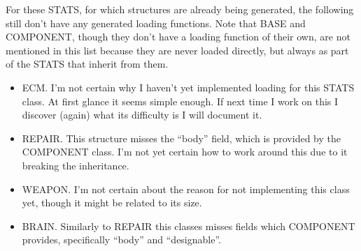 \documentclass{article}
\begin{document}
For these STATS, for which structures are already being generated, the following
still don't have any generated loading functions. Note that BASE and COMPONENT,
though they don't have a loading function of their own, are not mentioned in
this list because they are never loaded directly, but always as part of the
STATS that inherit from them.
\begin{itemize}
  \item ECM. I'm not certain why I haven't yet implemented loading for this
    STATS class. At first glance it seems simple enough. If next time I work on
    this I discover (again) what its difficulty is I will document it.
  \item REPAIR. This structure misses the ``body'' field, which is provided by
    the COMPONENT class. I'm not yet certain how to work around this due to it
    breaking the inheritance.
  \item WEAPON. I'm not certain about the reason for not implementing this class
    yet, though it might be related to its size.
  \item BRAIN. Similarly to REPAIR this classes misses fields which COMPONENT
    provides, specifically ``body'' and ``designable''.
\end{itemize}
\end{document}
